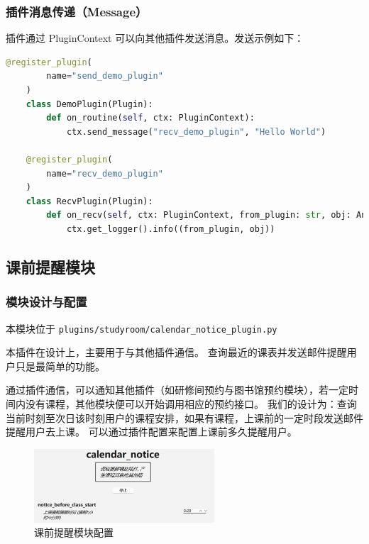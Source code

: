 \documentclass[14pt,a4paper,UTF8,twoside]{article}
\begin{document}
\subsubsection{插件消息传递（Message）}

插件通过 PluginContext 可以向其他插件发送消息。发送示例如下：

\begin{lstlisting}[language=python, title = 发送消息示例]
    @register_plugin(
        name="send_demo_plugin"
    )
    class DemoPlugin(Plugin):
        def on_routine(self, ctx: PluginContext):
            ctx.send_message("recv_demo_plugin", "Hello World")
    
    @register_plugin(
        name="recv_demo_plugin"
    )
    class RecvPlugin(Plugin):
        def on_recv(self, ctx: PluginContext, from_plugin: str, obj: Any):
            ctx.get_logger().info((from_plugin, obj))
\end{lstlisting}

\subsection{课前提醒模块}

\subsubsection{模块设计与配置}

\begin{mdframed}
    本模块位于 \texttt{plugins/studyroom/calendar\_notice\_plugin.py}
\end{mdframed}

本插件在设计上，主要用于与其他插件通信。
查询最近的课表并发送邮件提醒用户只是最简单的功能。

\begin{note}
通过插件通信，可以通知其他插件（如研修间预约与图书馆预约模块），若一定时间内没有课程，其他模块便可以开始调用相应的预约接口。
我们的设计为：查询当前时刻至次日该时刻用户的课程安排，如果有课程，上课前的一定时段发送邮件提醒用户去上课。
可以通过插件配置来配置上课前多久提醒用户。
\end{note}

\begin{figure}[H]
    \centering
    \includegraphics[width=0.6\textwidth]{img/calendar_notice_config.png}
    \caption{课前提醒模块配置}
    \label{fig:calendar_notice_config}
\end{figure}
\end{document}
